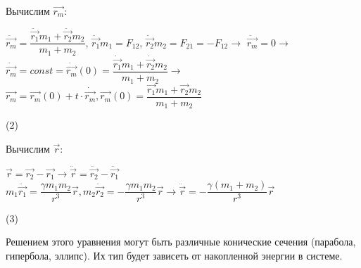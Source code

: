 \documentclass[12pt,a4paper,fleqn]{article}
\begin{document}
Вычислим $\vec{r_m}$:
\begin{center}
$\ddot{\vec{r_m}} = \dfrac{\ddot{\vec{r_1}}m_1 + \ddot{\vec{r_2}}m_2}{m_1 + m_2}$, $\ddot{\vec{r_1}}m_1 = F_{12}$, $\ddot{\vec{r_2}}m_2 = F_{21} = -F_{12} \rightarrow$ \newline
$\ddot{\vec{r_m}} = 0 \rightarrow$ \newline
$\dot{\vec{r_m}} = const = \dot{\vec{r_m}}(0) = \dfrac{\dot{\vec{r_1}}m_1 + \dot{\vec{r_2}}m_2}{m_1 + m_2} \rightarrow$ \newline
$\vec{r_m} = \vec{r_m}(0) + t \cdot \dot{\vec{r_m}}, \vec{r_m}(0) = \dfrac{\vec{r_1}m_1 + \vec{r_2}m_2}{m_1 + m_2}$
\begin{flushright}
(2)
\end{flushright}
\end{center} 
Вычислим $\vec{r}$:
\begin{center}
$\vec{r} = \vec{r_2} - \vec{r_1} \rightarrow \ddot{\vec{r}} = \ddot{\vec{r_2}} - \ddot{\vec{r_1}}$ \newline
$m_1 \ddot{\vec{r_1}} = \dfrac{\gamma m_1 m_2}{r^3} \vec{r}, m_2 \ddot{\vec{r_2}} = - \dfrac{\gamma m_1 m_2}{r^3} \vec{r} \rightarrow \ddot{\vec{r}} = -\dfrac{\gamma (m_1 + m_2)}{r^3} \vec{r}$
\begin{flushright}
(3)
\end{flushright}
\end{center}
Решением этого уравнения могут быть различные конические сечения (парабола, гипербола, эллипс). Их тип будет зависеть от накопленной энергии в системе.
\end{document}
